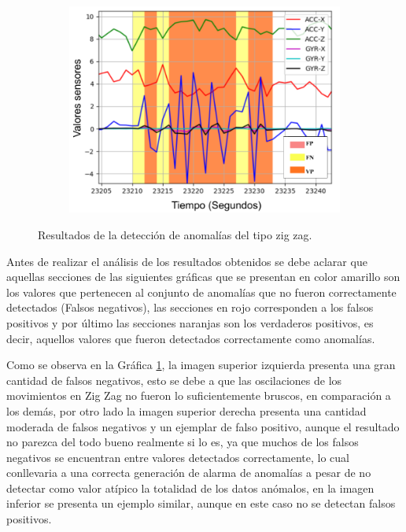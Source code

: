 \begin{figure}[H]
{\begin{varwidth}{\textwidth}
\begin{subfigure}[h]{0.45\textwidth}
        \end{subfigure}
        \begin{subfigure}[h]{0.45\textwidth} 
            \includegraphics[width=\textwidth]{imagenes/Cap5/zig_zag3}
        \end{subfigure} 
        \end{varwidth}}
        \caption{Resultados de la detecci\'{o}n de anomal\'{i}as del tipo zig zag.}
		\label{fig:resultados_zigzag}
    \end{figure}
    
Antes de realizar el an\'{a}lisis de los resultados obtenidos se debe aclarar que aquellas secciones de las siguientes gr\'{a}ficas que se presentan en color amarillo son los valores que pertenecen al conjunto de anomal\'{i}as que no fueron correctamente detectados (Falsos negativos), las secciones en rojo corresponden a los falsos positivos y por \'{u}ltimo las secciones naranjas son los verdaderos positivos, es decir, aquellos valores que fueron detectados correctamente como anomal\'{i}as.

\vspace{5mm} %

Como se observa en la Gr\'{a}fica \ref{fig:resultados_zigzag}, la imagen superior izquierda presenta una gran cantidad de falsos negativos, esto se debe a que las oscilaciones de los movimientos en Zig Zag no fueron lo suficientemente bruscos, en comparaci\'{o}n a los dem\'{a}s, por otro lado la imagen superior derecha presenta una cantidad moderada de falsos negativos y un ejemplar de falso positivo, aunque el resultado no parezca del todo bueno realmente si lo es, ya que muchos de los falsos negativos se encuentran entre valores detectados correctamente, lo cual conllevaria a una correcta generaci\'{o}n de alarma de anomal\'{i}as a pesar de no detectar como valor at\'{i}pico la totalidad de los datos an\'{o}malos, en la imagen inferior se presenta un ejemplo similar, aunque en este caso no se detectan falsos positivos.

